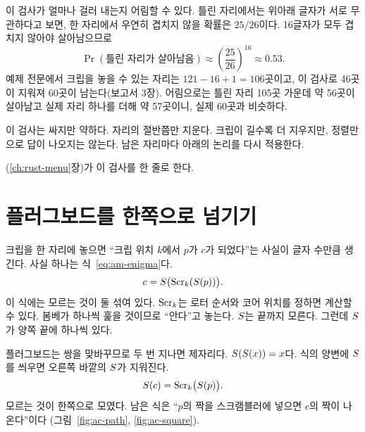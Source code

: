 \Why 이 검사가 얼마나 걸러 내는지 어림할 수 있다. 틀린 자리에서는 위아래 글자가 서로 무관하다고 보면, 한 자리에서
우연히 겹치지 않을 확률은 $25/26$이다. 16글자가 모두 겹치지 않아야 살아남으므로
\begin{equation}
  \Pr(\text{틀린 자리가 살아남음}) \approx \left(\frac{25}{26}\right)^{16} \approx 0.53 . \label{eq:ac-survive}
\end{equation}
예제 전문에서 크립을 놓을 수 있는 자리는 $121 - 16 + 1 = 106$곳이고, 이 검사로 46곳이 지워져 60곳이 남는다(보고서 3장).
어림으로는 틀린 자리 105곳 가운데 약 56곳이 살아남고 실제 자리 하나를 더해 약 57곳이니, 실제 60곳과 비슷하다.

이 검사는 싸지만 약하다. 자리의 절반쯤만 지운다. 크립이 길수록 더 지우지만, 정렬만으로 답이 나오지는 않는다.
남은 자리마다 아래의 논리를 다시 적용한다.

\Ours {}(\ref{ch:rust-menu}장)가 이 검사를 한 줄로 한다.

\section{플러그보드를 한쪽으로 넘기기}\label{sec:ac-move}

크립을 한 자리에 놓으면 ``크립 위치 $k$에서 $p$가 $c$가 되었다''는 사실이 글자 수만큼 생긴다. 사실 하나는
식~\eqref{eq:am-enigma}다.
\[
  c = S\bigl(\mathrm{Scr}_k(S(p))\bigr).
\]
이 식에는 모르는 것이 둘 섞여 있다. $\mathrm{Scr}_k$는 로터 순서와 코어 위치를 정하면 계산할 수 있다. 봄베가 하나씩
훑을 것이므로 ``안다''고 놓는다. $S$는 끝까지 모른다. 그런데 $S$가 양쪽 끝에 하나씩 있다.

\Why 플러그보드는 쌍을 맞바꾸므로 두 번 지나면 제자리다. $S(S(x)) = x$다. 식의 양변에 $S$를 씌우면
오른쪽 바깥의 $S$가 지워진다.
\begin{equation}
  S(c) = \mathrm{Scr}_k\bigl(S(p)\bigr). \label{eq:ac-moved}
\end{equation}
모르는 것이 한쪽으로 모였다. 남은 식은 ``$p$의 짝을 스크램블러에 넣으면 $c$의 짝이 나온다''이다
(그림~\ref{fig:ac-path}, \ref{fig:ac-square}).

